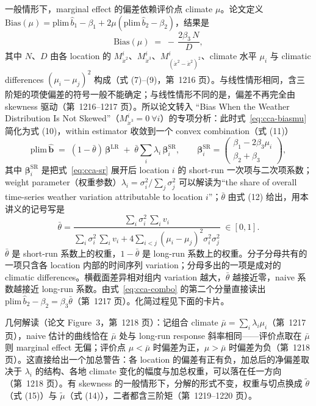 一般情形下，marginal effect 的偏差依赖评价点 climate $\mu$。论文定义 $\mathrm{Bias}(\mu)=\mathrm{plim}\,\widehat{b}_1-\beta_1+2\mu(\mathrm{plim}\,\widehat{b}_2-\beta_2)$，结果是
\begin{equation}
\mathrm{Bias}(\mu) \;=\; -\,\frac{2\beta_3\,N}{D} ,
\label{eq:cca-biasmu}
\end{equation}
其中 $N$、$D$ 由各 location 的 $M^i_{\ddot{x}^2}$、$M^i_{\ddot{x}^3}$、$M^i_{(\ddot{x}^2-\ddot{x}^2)^2}$、climate 水平 $\mu_i$ 与 climatic differences $(\mu_i-\mu_j)^2$ 构成（式 (7)--(9)，第~1216 页）。与线性情形相同，含三阶矩的项使偏差的符号一般不能确定；与线性情形不同的是，偏差不再完全由 skewness 驱动（第~1216--1217 页）。所以论文转入 ``Bias When the Weather Distribution Is Not Skewed''\citep[第~1217 页]{merel2021climate}（$M^i_{\ddot{x}^3}=0\ \forall i$）的专项分析：此时式~\ref{eq:cca-biasmu} 简化为式 (10)，within estimator 收敛到一个 convex combination（式 (11)）
\begin{equation}
\mathrm{plim}\,\widehat{\mathbf{b}} \;=\; (1-\bar\theta)\,\boldsymbol{\beta}^{\mathrm{LR}} \;+\; \bar\theta\sum_i \lambda_i\,\boldsymbol{\beta}^{\mathrm{SR}}_{i},
\qquad
\boldsymbol{\beta}^{\mathrm{SR}}_{i} = \begin{pmatrix} \beta_1 - 2\beta_3\mu_i \\ \beta_2+\beta_3 \end{pmatrix},
\label{eq:cca-combo}
\end{equation}
其中 $\boldsymbol{\beta}^{\mathrm{SR}}_{i}$ 是把式~\ref{eq:cca-sr} 展开后 location $i$ 的 short-run 一次项与二次项系数；weight parameter（权重参数）$\lambda_i = \sigma_i^2\big/\sum_j \sigma_j^2$ 可以解读为``the share of overall time-series weather variation attributable to location $i$''\citep[第~1217 页]{merel2021climate}；$\bar\theta$ 由式 (12) 给出，用本讲义的记号写是
\begin{equation}
\bar\theta=\frac{\sum_i\sigma_i^2\,\sum_i v_i}{\sum_i\sigma_i^2\,\sum_i v_i+4\sum_{i<j}(\mu_i-\mu_j)^2\sigma_i^2\sigma_j^2}\;\in[0,1] .
\label{eq:cca-theta}
\end{equation}
$\bar\theta$ 是 short-run 系数上的权重，$1-\bar\theta$ 是 long-run 系数上的权重。分子分母共有的一项只含各 location 内部的时间序列 variation；分母多出的一项是成对的 climatic differences。横截面差异相对组内 variation 越大，$\bar\theta$ 越接近零，naive 系数越接近 long-run 系数。由式~\ref{eq:cca-combo} 的第二个分量直接读出 $\mathrm{plim}\,\widehat{b}_2-\beta_2=\beta_3\bar\theta$（第~1217 页）。化简过程见下面的卡片。

几何解读（论文 Figure~3，第~1218 页）：记组合 climate $\bar{\mu} = \sum_i \lambda_i \mu_i$（第~1217 页），naive 估计的曲线恰在 $\bar\mu$ 处与 long-run response 斜率相同——评价点取在 $\bar{\mu}$ 则 marginal effect 无偏；评价点 $\mu<\bar{\mu}$ 时偏差为正，$\mu>\bar{\mu}$ 时偏差为负（第~1218 页）。这直接给出一个加总警告：各 location 的偏差有正有负，加总后的净偏差取决于 $\lambda_i$ 的结构、各地 climate 变化的幅度与加总权重，可以落在任一方向（第~1218 页）。有 skewness 的一般情形下，分解的形式不变，权重与切点换成 $\tilde\theta$（式 (15)）与 $\tilde\mu$（式 (14)），二者都含三阶矩（第~1219--1220 页）。

